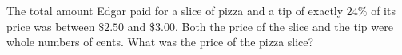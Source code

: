 The total amount Edgar paid for a slice of pizza and a tip of exactly $24\%$ of its price was between $\$2.50$ and $\$3.00$. Both the price of the slice and the tip were whole numbers of cents. What was the price of the pizza slice?
